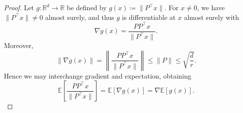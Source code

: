 \documentclass[10pt]{article}
\begin{document}
\begin{proof}
Let $g:\mathbb{R}^d\to\mathbb{R}$ be defined by $g(x)\coloneqq \|P^\top x\|$.
For $x\neq 0$, we have $\|P^\top x\|\neq 0$ almost surely, and thus $g$ is differentiable at $x$ almost surely with
\begin{equation}\label{eq:grad_g}
\nabla g(x)=\frac{PP^\top x}{\|P^\top x\|}.
\end{equation}
Moreover,
\begin{equation}\label{eq:grad_bound}
\left\|\nabla g(x)\right\|
=\left\|\frac{PP^\top x}{\|P^\top x\|}\right\|
\le \|P\|
\le \sqrt{\frac{d}{r}} .
\end{equation}
Hence we may interchange gradient and expectation, obtaining
\begin{equation}\label{eq:swap}
\mathbb{E}\!\left[\frac{PP^\top x}{\|P^\top x\|}\right]
=\mathbb{E}[\nabla g(x)]
=\nabla \mathbb{E}[g(x)].
\end{equation}


\end{proof}
\end{document}
